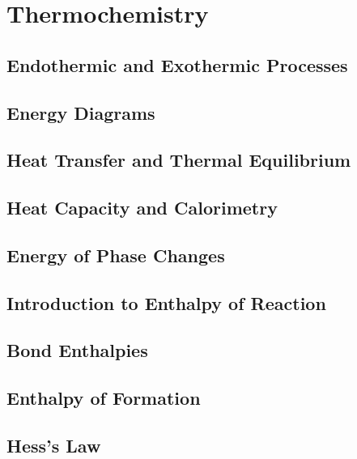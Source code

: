 \documentclass[../chem.tex]{subfiles}
\begin{document}
\chapter{Thermochemistry}
\section{Endothermic and Exothermic Processes}
\section{Energy Diagrams}
\section{Heat Transfer and Thermal Equilibrium}
\section{Heat Capacity and Calorimetry}
\section{Energy of Phase Changes}
\section{Introduction to Enthalpy of Reaction}
\section{Bond Enthalpies}
\section{Enthalpy of Formation}
\section{Hess's Law}
\end{document}
